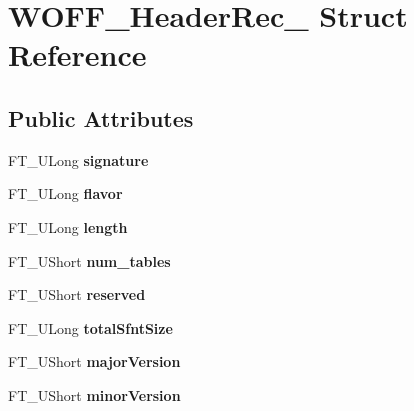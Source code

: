 \hypertarget{struct_w_o_f_f___header_rec__}{}\section{W\+O\+F\+F\+\_\+\+Header\+Rec\+\_\+ Struct Reference}
\label{struct_w_o_f_f___header_rec__}
\subsection*{Public Attributes}
\begin{DoxyCompactItemize}
\item 
\mbox{\label{struct_w_o_f_f___header_rec___a4ecfcefa20b9b5c897d82727293e7111}} 
F\+T\+\_\+\+U\+Long {\bfseries signature}
\item 
\mbox{\label{struct_w_o_f_f___header_rec___ac805e897e024bfe4cd363f09138e2a5a}} 
F\+T\+\_\+\+U\+Long {\bfseries flavor}
\item 
\mbox{\label{struct_w_o_f_f___header_rec___a7cade0fd6f387b1e618804af7d113c6a}} 
F\+T\+\_\+\+U\+Long {\bfseries length}
\item 
\mbox{\label{struct_w_o_f_f___header_rec___a50c23865dcbfe3521af337bb54f68b01}} 
F\+T\+\_\+\+U\+Short {\bfseries num\+\_\+tables}
\item 
\mbox{\label{struct_w_o_f_f___header_rec___a968e375e8e226a532ae19570b38da37c}} 
F\+T\+\_\+\+U\+Short {\bfseries reserved}
\item 
\mbox{\label{struct_w_o_f_f___header_rec___af1ab5dfddb4318368b20d2542b284fc4}} 
F\+T\+\_\+\+U\+Long {\bfseries total\+Sfnt\+Size}
\item 
\mbox{\label{struct_w_o_f_f___header_rec___a814bef54b9aedb973bec2ef4009a8031}} 
F\+T\+\_\+\+U\+Short {\bfseries major\+Version}
\item 
\mbox{\label{struct_w_o_f_f___header_rec___a39532ac80b6d675eea62b8c2f586d9e3}} 
F\+T\+\_\+\+U\+Short {\bfseries minor\+Version}

\end{DoxyCompactItemize}
